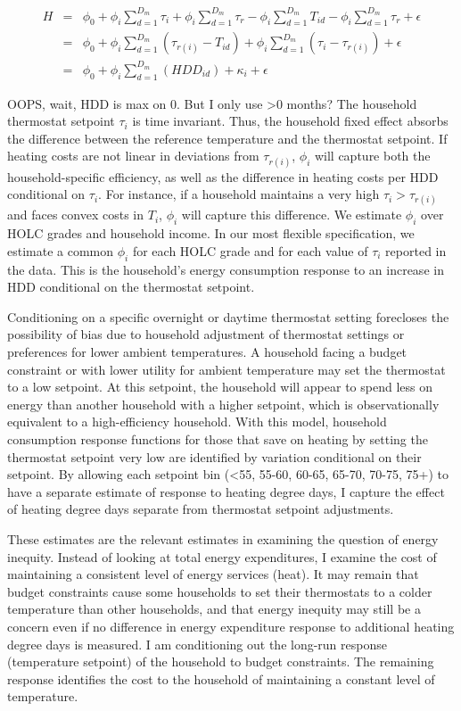\documentclass[
]{article}
\begin{document}
\begin{eqnarray}
H &=& \phi_0 + \phi_i \sum_{d=1}^{D_m}\tau_i + \phi_i \sum_{d=1}^{D_m} \tau_r - \phi_i \sum_{d=1}^{D_m} T_{id} - \phi_i \sum_{d=1}^{D_m} \tau_r + \epsilon \nonumber \\
 &=& \phi_0 + \phi_i \sum_{d=1}^{D_m}(\tau_{r(i)} - T_{id}) + \phi_i \sum_{d=1}^{D_m}(\tau_i-\tau_{r(i)}) + \epsilon \nonumber \\
 &=& \phi_0 + \phi_i \sum_{d=1}^{D_m}(HDD_{id}) + \kappa_{i} + \epsilon \label{eq:hdd2}
\end{eqnarray}

OOPS, wait, HDD is max on 0. But I only use \textgreater0 months? The household thermostat setpoint \(\tau_i\) is time invariant. Thus, the household fixed effect absorbs the difference between the reference temperature and the thermostat
setpoint. If heating costs are not linear in deviations from \(\tau_{r(i)}\), \(\phi_i\) will capture both the household-specific efficiency, as well as the difference in
heating costs per HDD conditional on \(\tau_i\). For instance, if a household maintains a very high \(\tau_i>\tau_{r(i)}\) and faces convex costs in \(T_{i}\), \(\phi_i\) will
capture this difference. We estimate \(\phi_i\) over HOLC grades and household income. In our most flexible specification, we estimate a common \(\phi_i\) for each HOLC grade and for each value of \(\tau_i\) reported in the data. This is the household's energy consumption response to an increase in HDD conditional on the thermostat setpoint.

Conditioning on a specific overnight or daytime thermostat setting forecloses the possibility of bias due to household adjustment of thermostat settings or preferences for lower ambient temperatures. A household facing a budget constraint or with lower utility for ambient temperature may set the thermostat to a low setpoint. At this setpoint, the household will appear to spend less on energy than another household with a higher setpoint, which is observationally equivalent to a high-efficiency household. With this model, household consumption response functions for those that save on heating by setting the thermostat setpoint very low are identified by variation conditional on their setpoint. By allowing each setpoint bin
(\textless55, 55-60, 60-65, 65-70, 70-75, 75+) to have a separate estimate of response to heating degree days, I capture the effect of heating degree days separate from thermostat setpoint adjustments.

These estimates are the relevant estimates in examining the question of energy inequity. Instead of looking at total energy expenditures, I examine the cost of maintaining a consistent level of energy services (heat). It may remain that budget constraints cause some households to set their thermostats to a colder temperature than other households, and that energy inequity may still be a concern even if no difference in energy expenditure response to additional heating degree days is measured. I am conditioning out the long-run response (temperature setpoint) of the household to budget constraints. The remaining response identifies the cost to the household of maintaining a constant level of temperature.
\end{document}
